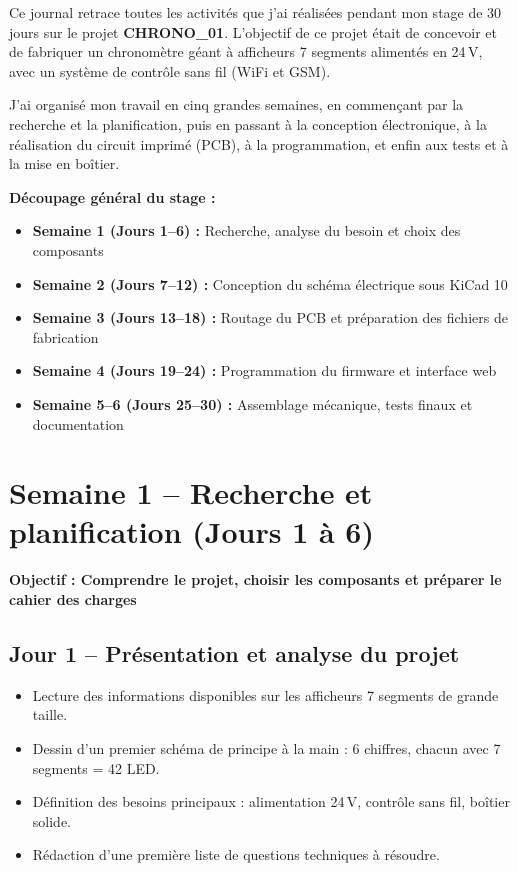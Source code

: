 \documentclass[12pt,a4paper]{article}
\begin{document}
Ce journal retrace toutes les activités que j'ai réalisées pendant mon stage de 30 jours sur le projet \textbf{CHRONO\_01}. L'objectif de ce projet était de concevoir et de fabriquer un chronomètre géant à afficheurs 7 segments alimentés en 24\,V, avec un système de contrôle sans fil (WiFi et GSM).

J'ai organisé mon travail en cinq grandes semaines, en commençant par la recherche et la planification, puis en passant à la conception électronique, à la réalisation du circuit imprimé (PCB), à la programmation, et enfin aux tests et à la mise en boîtier.

\bigskip
\noindent\textbf{Découpage général du stage :}
\begin{itemize}
    \item \textbf{Semaine 1 (Jours 1--6) :} Recherche, analyse du besoin et choix des composants
    \item \textbf{Semaine 2 (Jours 7--12) :} Conception du schéma électrique sous KiCad 10
    \item \textbf{Semaine 3 (Jours 13--18) :} Routage du PCB et préparation des fichiers de fabrication
    \item \textbf{Semaine 4 (Jours 19--24) :} Programmation du firmware et interface web
    \item \textbf{Semaine 5--6 (Jours 25--30) :} Assemblage mécanique, tests finaux et documentation
\end{itemize}

\newpage

\section{Semaine 1 -- Recherche et planification (Jours 1 à 6)}

\colorbox{semaine1}{\parbox{\linewidth}{\centering\textbf{Objectif : Comprendre le projet, choisir les composants et préparer le cahier des charges}}}

\bigskip

\subsection*{Jour 1 -- Présentation et analyse du projet}
\begin{itemize}
    \item Lecture des informations disponibles sur les afficheurs 7 segments de grande taille.
    \item Dessin d'un premier schéma de principe à la main : 6 chiffres, chacun avec 7 segments = 42 LED.
    \item Définition des besoins principaux : alimentation 24\,V, contrôle sans fil, boîtier solide.
    \item Rédaction d'une première liste de questions techniques à résoudre.
\end{itemize}
\end{document}
